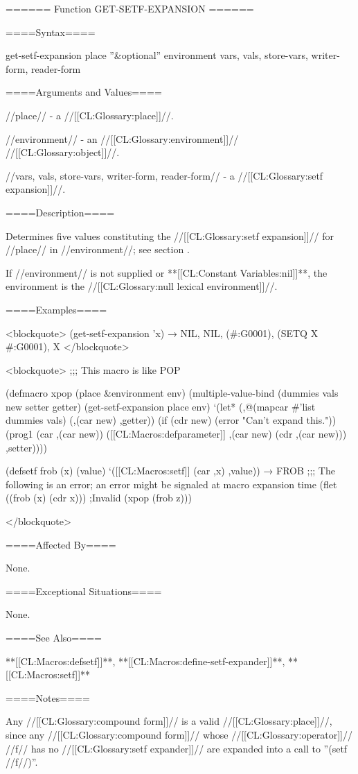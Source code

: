 ====== Function GET-SETF-EXPANSION ======

====Syntax====

\DefunWithValuesNewline get-setf-expansion {place ''&optional'' environment} {vars, vals, store-vars, writer-form, reader-form}

====Arguments and Values====

//place// - a //[[CL:Glossary:place]]//.

//environment// - an //[[CL:Glossary:environment]]// //[[CL:Glossary:object]]//.

//vars, vals, store-vars, writer-form, reader-form// - a //[[CL:Glossary:setf expansion]]//.

====Description====

Determines five values constituting the //[[CL:Glossary:setf expansion]]// for //place// in //environment//; see section {\secref\SetfExpansions}.



If //environment// is not supplied or **[[CL:Constant Variables:nil]]**, the environment is the //[[CL:Glossary:null lexical environment]]//.

====Examples====

<blockquote> (get-setf-expansion 'x) → NIL, NIL, (#:G0001), (SETQ X #:G0001), X </blockquote>

<blockquote> ;;; This macro is like POP

(defmacro xpop (place &environment env) (multiple-value-bind (dummies vals new setter getter) (get-setf-expansion place env) `(let* (,@(mapcar #'list dummies vals) (,(car new) ,getter)) (if (cdr new) (error "Can't expand this.")) (prog1 (car ,(car new)) ([[CL:Macros:defparameter]] ,(car new) (cdr ,(car new))) ,setter))))

(defsetf frob (x) (value) `([[CL:Macros:setf]] (car ,x) ,value)) → FROB ;;; The following is an error; an error might be signaled at macro expansion time (flet ((frob (x) (cdr x))) ;Invalid (xpop (frob z)))

</blockquote>



====Affected By====

None.

====Exceptional Situations====

None.

====See Also====

**[[CL:Macros:defsetf]]**, **[[CL:Macros:define-setf-expander]]**, **[[CL:Macros:setf]]**

====Notes====

Any //[[CL:Glossary:compound form]]// is a valid //[[CL:Glossary:place]]//, since any //[[CL:Glossary:compound form]]// whose //[[CL:Glossary:operator]]// //f// has no //[[CL:Glossary:setf expander]]// are expanded into a call to ''(setf //f//)''.

    
